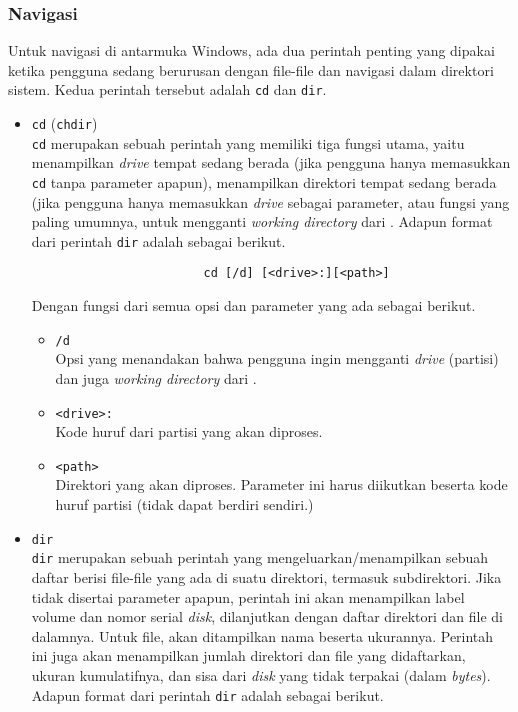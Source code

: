 \subsubsection{Navigasi}
\label{sec:commandline-windows-nav}

Untuk navigasi di antarmuka \cl Windows, ada dua perintah penting yang dipakai ketika pengguna sedang berurusan dengan file-file dan navigasi dalam direktori sistem. Kedua perintah tersebut adalah \verb|cd| dan \verb|dir|.

\begin{itemize}
	\item \verb|cd| (\verb|chdir|) \cite{microsoftdocs:2021:windowscommands}\\
	\verb|cd| merupakan sebuah perintah yang memiliki tiga fungsi utama, yaitu menampilkan \textit{drive} tempat sedang \cl berada (jika pengguna hanya memasukkan \verb|cd| tanpa parameter apapun), menampilkan direktori tempat \cl sedang berada (jika pengguna hanya memasukkan \textit{drive} sebagai parameter, atau fungsi yang paling umumnya, untuk mengganti \textit{working directory} dari \cl.
	\newline\newline
	Adapun format dari perintah \verb|dir| adalah sebagai berikut.
	
	\begin{verbatim}
                        cd [/d] [<drive>:][<path>]
	\end{verbatim}
	
	\newpage %
	Dengan fungsi dari semua opsi dan parameter yang ada sebagai berikut.
	
	\begin{itemize}
		\item \verb|/d|\\
		Opsi yang menandakan bahwa pengguna ingin mengganti \textit{drive} (partisi) dan juga \textit{working directory} dari \cl.
		\item \verb|<drive>:|\\
		Kode huruf dari partisi yang akan diproses.
		\item \verb|<path>|\\
		Direktori yang akan diproses. Parameter ini harus diikutkan beserta kode huruf partisi (tidak dapat berdiri sendiri.)
	\end{itemize}
	
	\item \verb|dir|\\
	\verb|dir| merupakan sebuah perintah yang mengeluarkan/menampilkan sebuah daftar berisi file-file yang ada di suatu direktori, termasuk subdirektori. Jika tidak disertai parameter apapun, perintah ini akan menampilkan label volume dan nomor serial \textit{disk}, dilanjutkan dengan daftar direktori dan file di dalamnya. Untuk file, akan ditampilkan nama beserta ukurannya. Perintah ini juga akan menampilkan jumlah direktori dan file yang didaftarkan, ukuran kumulatifnya, dan sisa dari \textit{disk} yang tidak terpakai (dalam \textit{bytes}).\cite{microsoftdocs:2021:windowscommands}
	\newline\newline
	Adapun format dari perintah \verb|dir| adalah sebagai berikut.\cite{mueller:2007:windowscommandline}
	

\end{itemize}
